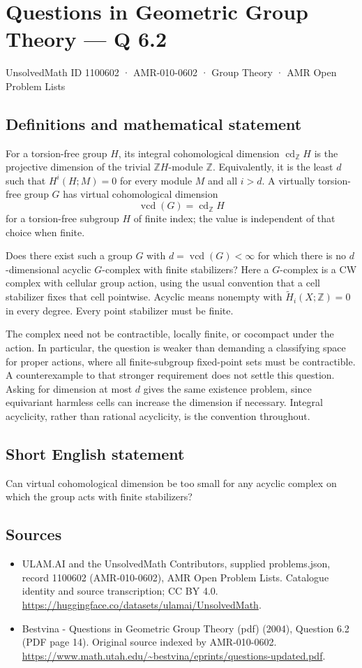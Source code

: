 \documentclass[11pt,a4paper]{article}
\begin{document}
\section*{Questions in Geometric Group Theory — Q 6.2}\label{1100602}
{\small UnsolvedMath ID 1100602 · AMR-010-0602 · Group Theory · AMR Open Problem Lists}
\subsection{Definitions and mathematical statement}
For a torsion-free group $H$, its integral cohomological dimension $\operatorname{cd}_{\mathbb Z}H$ is the projective dimension of the trivial $\mathbb ZH$-module $\mathbb Z$. Equivalently, it is the least $d$ such that $H^i(H;M)=0$ for every module $M$ and all $i>d$. A virtually torsion-free group $G$ has virtual cohomological dimension
\[
 \operatorname{vcd}(G)=\operatorname{cd}_{\mathbb Z}H
\]
for a torsion-free subgroup $H$ of finite index; the value is independent of that choice when finite.

Does there exist such a group $G$ with $d=\operatorname{vcd}(G)<\infty$ for which there is no $d$-dimensional acyclic $G$-complex with finite stabilizers? Here a $G$-complex is a CW complex with cellular group action, using the usual convention that a cell stabilizer fixes that cell pointwise. Acyclic means nonempty with $\widetilde H_i(X;\mathbb Z)=0$ in every degree. Every point stabilizer must be finite.

The complex need not be contractible, locally finite, or cocompact under the action. In particular, the question is weaker than demanding a classifying space for proper actions, where all finite-subgroup fixed-point sets must be contractible. A counterexample to that stronger requirement does not settle this question. Asking for dimension at most $d$ gives the same existence problem, since equivariant harmless cells can increase the dimension if necessary. Integral acyclicity, rather than rational acyclicity, is the convention throughout.
\subsection{Short English statement}
Can virtual cohomological dimension be too small for any acyclic complex on which the group acts with finite stabilizers?
\subsection{Sources}
\begin{itemize}
\item[S1] ULAM.AI and the UnsolvedMath Contributors, supplied problems.json, record 1100602 (AMR-010-0602), AMR Open Problem Lists. Catalogue identity and source transcription; CC BY 4.0.
\url{https://huggingface.co/datasets/ulamai/UnsolvedMath}.
\item[S2] Bestvina - Questions in Geometric Group Theory (pdf) (2004), Question 6.2 (PDF page 14). Original source indexed by AMR-010-0602.
\url{https://www.math.utah.edu/~bestvina/eprints/questions-updated.pdf}.
\end{itemize}
\end{document}
